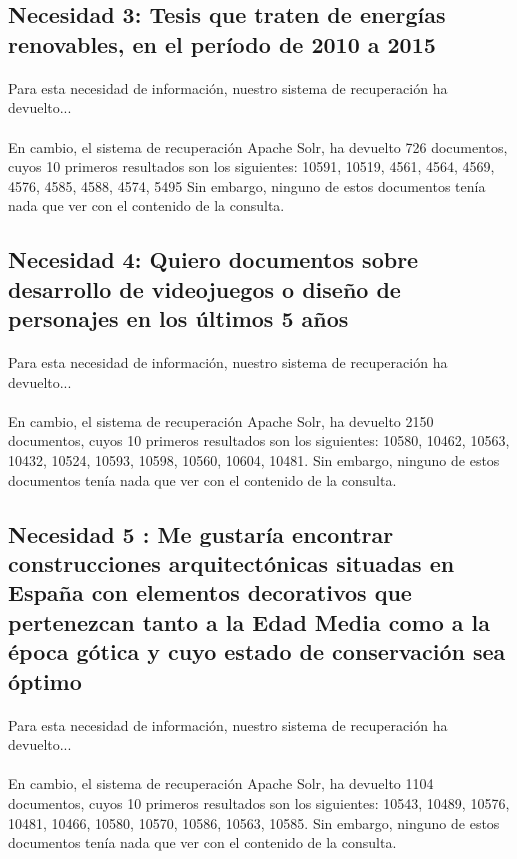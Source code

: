 \documentclass[a4paper]{article}
\begin{document}
\subsection{Necesidad 3: Tesis que traten de energías renovables, en el período de 2010 a 2015}
\paragraph{}Para esta necesidad de información, nuestro sistema de recuperación ha devuelto...
\paragraph{}En cambio, el sistema de recuperación Apache Solr, ha devuelto 726 documentos, cuyos 10 primeros resultados son los siguientes: 10591, 10519, 4561, 4564, 4569, 4576, 4585, 4588, 4574, 5495 Sin embargo, ninguno de estos documentos tenía nada que ver con el contenido de la consulta.
\subsection{Necesidad 4: Quiero documentos sobre desarrollo de videojuegos o diseño de personajes en los últimos 5 años}
\paragraph{}Para esta necesidad de información, nuestro sistema de recuperación ha devuelto...
\paragraph{}En cambio, el sistema de recuperación Apache Solr, ha devuelto 2150 documentos, cuyos 10 primeros resultados son los siguientes: 10580, 10462, 10563, 10432, 10524, 10593, 10598, 10560, 10604, 10481. Sin embargo, ninguno de estos documentos tenía nada que ver con el contenido de la consulta.
\subsection{Necesidad 5 : Me gustaría encontrar construcciones arquitectónicas situadas en España con elementos decorativos que pertenezcan tanto a la Edad Media como a la época gótica y cuyo estado de conservación sea óptimo}
\paragraph{}Para esta necesidad de información, nuestro sistema de recuperación ha devuelto...
\paragraph{}En cambio, el sistema de recuperación Apache Solr, ha devuelto 1104 documentos, cuyos 10 primeros resultados son los siguientes: 10543, 10489, 10576, 10481, 10466, 10580, 10570, 10586, 10563, 10585. Sin embargo, ninguno de estos documentos tenía nada que ver con el contenido de la consulta.
\end{document}
